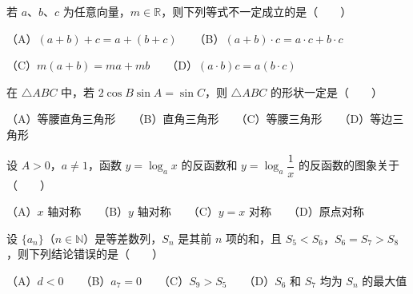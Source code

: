 \begin{question}
若 $a\text{、}b\text{、}c$ 为任意向量，$m\in\mathbb R$，则下列等式不一定成立的是\mbox{（　　）}

（A）$(a+b)+c=a+(b+c)$　　（B）$(a+b)\cdot c=a\cdot c+b\cdot c$

（C）$m(a+b)=ma+mb$　　（D）$(a\cdot b)c=a(b\cdot c)$

\end{question}
\begin{question}
在 $\triangle ABC$ 中，若 $2\cos B\sin A=\sin C$，则 $\triangle ABC$ 的形状一定是\mbox{（　　）}

（A）等腰直角三角形　　（B）直角三角形　　（C）等腰三角形　　（D）等边三角形

\end{question}
\begin{question}
设 $A>0$，$a\ne1$，函数 $y=\log_a x$ 的反函数和 $y=\log_a\dfrac1x$ 的反函数的图象关于\mbox{（　　）}

（A）$x$ 轴对称　　（B）$y$ 轴对称　　（C）$y=x$ 对称　　（D）原点对称

\end{question}
\begin{question}
设 $\{a_n\}$（$n\in\mathbb N$）是等差数列，$S_n$ 是其前 $n$ 项的和，且 $S_5<S_6$，$S_6=S_7>S_8$，则下列结论错误的是\mbox{（　　）}

（A）$d<0$　　（B）$a_7=0$　　（C）$S_9>S_5$　　（D）$S_6$ 和 $S_7$ 均为 $S_n$ 的最大值

\end{question}

